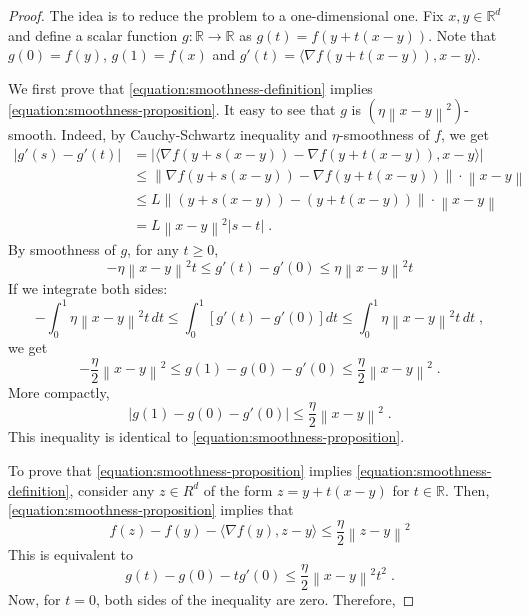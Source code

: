 \documentclass[12pt]{article}
\newcommand{\R}{\mathbb{R}}
\newcommand{\grad}{\nabla}
\newcommand{\norm}[1]{\left\|#1\right\|}
\begin{document}
\begin{proof}
The idea is to reduce the problem to a one-dimensional one. Fix $x,y \in \R^d$
and define a scalar function $g:\R \to \R$ as $g(t) = f(y + t (x - y))$. Note
that $g(0) = f(y)$, $g(1) = f(x)$ and $g'(t) = \langle \grad f(y + t(x - y)), x -
y \rangle$.

We first prove that \eqref{equation:smoothness-definition} implies \eqref{equation:smoothness-proposition}.
It easy to see that $g$ is $(\eta \norm{x-y}^2)$-smooth. Indeed, by Cauchy-Schwartz inequality and $\eta$-smoothness of $f$, we get
\begin{align*}
|g'(s) - g'(t)|
& = \left| \langle \grad f(y + s(x - y)) - \grad f(y + t(x - y)), x - y \rangle \right| \\
& \le \norm{\grad f(y + s(x - y)) - \grad f(y + t(x - y))} \cdot \norm{x - y} \\
& \le L \norm{(y + s(x - y)) - (y + t(x - y))} \cdot \norm{x - y} \\
& = L \norm{x - y}^2 |s -  t| \; .
\end{align*}
By smoothness of $g$, for any $t \ge 0$,
$$
- \eta \norm{x-y}^2 t \le g'(t) - g'(0) \le \eta \norm{x-y}^2 t
$$
If we integrate both sides:
$$
- \int_0^1 \eta \norm{x-y}^2 t \, dt \le \int_0^1 \left[g'(t) - g'(0)\right] dt \le \int_0^1 \eta \norm{x-y}^2 t \, dt \; ,
$$
we get
$$
- \frac{\eta}{2} \norm{x-y}^2 \le g(1) - g(0) - g'(0) \le \frac{\eta}{2} \norm{x-y}^2 \; .
$$
More compactly,
$$
\left|g(1) - g(0) - g'(0)\right| \le \frac{\eta}{2} \norm{x-y}^2 \; .
$$
This inequality is identical to \eqref{equation:smoothness-proposition}.

To prove that \eqref{equation:smoothness-proposition} implies \eqref{equation:smoothness-definition},
consider any $z \in R^d$ of the form $z = y + t(x-y)$ for $t \in \R$. Then, \eqref{equation:smoothness-proposition} implies that
$$
f(z) - f(y) - \langle \grad f(y), z - y \rangle \le \frac{\eta}{2} \norm{z - y}^2
$$
This is equivalent to
$$
g(t) - g(0) - t g'(0) \le \frac{\eta}{2} \norm{x - y}^2 t^2 \; .
$$
Now, for $t = 0$, both sides of the inequality are zero. Therefore,
\end{proof}
\end{document}
